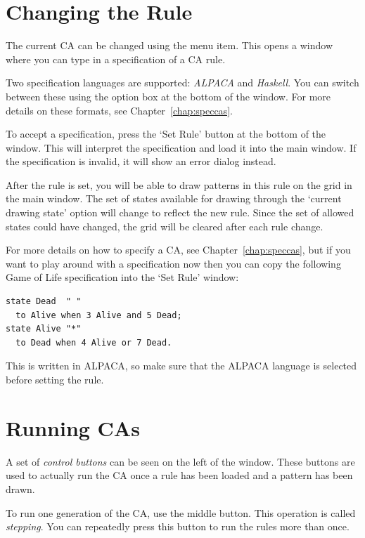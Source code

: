 \documentclass[oneside,a4paper]{memoir}
\begin{document}
\section{Changing the Rule}
\label{sec:chngrule}

The current CA can be changed using the  menu item.
This opens a window where you can type in a specification of a CA rule.

Two specification languages are supported: \emph{ALPACA} and \emph{Haskell}.
You can switch between these using the option box at the bottom of the window.
For more details on these formats, see Chapter~\ref{chap:speccas}.

To accept a specification, press the `Set Rule' button at the bottom of the window.
This will interpret the specification and load it into the main window.
If the specification is invalid, it will show an error dialog instead.

After the rule is set, you will be able to draw patterns in this rule on the grid in the main window.
The set of states available for drawing through the `current drawing state' option will change to reflect the new rule.
Since the set of allowed states could have changed, the grid will be cleared after each rule change.

For more details on how to specify a CA, see Chapter~\ref{chap:speccas},
  but if you want to play around with a specification now then you can copy the following Game of Life specification into the `Set Rule' window:

\begin{verbatim}
state Dead  " "
  to Alive when 3 Alive and 5 Dead;
state Alive "*"
  to Dead when 4 Alive or 7 Dead.
\end{verbatim}

This is written in ALPACA, so make sure that the ALPACA language is selected before setting the rule.

\section{Running CAs}
\label{sec:running}

A set of \emph{control buttons} can be seen on the left of the window.
These buttons are used to actually run the CA once a rule has been loaded and a pattern has been drawn.

To run one generation of the CA, use the middle button.
This operation is called \emph{stepping}.
You can repeatedly press this button to run the rules more than once.
\end{document}
